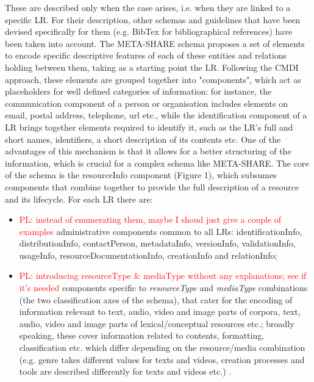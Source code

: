 \documentclass{llncs}
\begin{document}
These are described only when the case arises, i.e. when they are linked to a specific LR. For their description, other schemas and guidelines that have been devised specifically for them (e.g. BibTex for bibliographical references) have been taken into account.
The META-SHARE schema proposes a set of elements to encode specific descriptive features of each of these entities and relations holding between them, taking as a starting point the LR. Following the CMDI approach, these elements are grouped together into "components", which act as placeholders for well defined categories of information: for instance, the communication component of a person or organisation includes elements on email, postal address, telephone, url etc., while the identification component of a LR brings together elements required to identify it, such as the LR's full and short names, identifiers, a short description of its contents etc. One of the advantages of this mechanism is that it allows for a better structuring of the information, which is crucial for a complex schema like META-SHARE.
The core of the schema is the resourceInfo component (Figure 1), which subsumes components that combine together to provide the full description of a resource and its lifecycle. For each LR there are:
\begin{itemize}
\item \textcolor{red}{PL: instead of enumerating them, maybe I shoud just give a couple of examples}
administrative components common to all LRs: identificationInfo, distributionInfo, contactPerson, metadataInfo, versionInfo, validationInfo, usageInfo, resourceDocumentationInfo, creationInfo and relationInfo;
\item \textcolor{red}{PL: introducing resourceType \& mediaType without any explanations; see if it's needed}
\color[rgb]{0,0,0}\color[rgb]{0,0,0}components specific to {\it resourceType} and {\it mediaType} combinations (the two classification axes of the schema), that cater for the encoding of information relevant to text, audio, video and image parts of corpora, text, audio, video and image parts of lexical/conceptual resources etc.; broadly speaking, these cover information related to contents, formatting, classification etc. which differ depending on the resource/media combination (e.g. genre takes different values for texts and videos, creation processes and tools are described differently for texts and videos etc.) .
\end{itemize}
\end{document}

